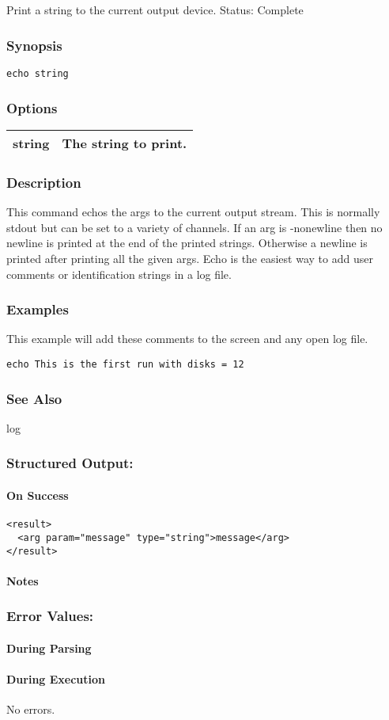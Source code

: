 \subsection{}
\label{echo}
Print a string to the current output device. 
 Status: Complete
\subsubsection*{Synopsis}
\begin{verbatim}
echo string
\end{verbatim}
\subsubsection*{Options}
\begin{tabular}{|l|l|}
\hline 
 string  & The string to print.  \\
 \hline 
\end{tabular}
\subsubsection*{Description}
 This command echos the args to the current output stream. This is normally stdout but can be set to a variety of channels. If an arg is -nonewline then no newline is printed at the end of the printed strings. Otherwise a newline is printed after printing all the given args. Echo is the easiest way to add user comments or identification strings in a log file. 
\subsubsection*{Examples}
 This example will add these comments to the screen and any open log file. \begin{verbatim}
echo This is the first run with disks = 12
\end{verbatim}
\subsubsection*{See Also}
 log
\subsubsection*{Structured Output:}
\paragraph*{On Success}
\begin{verbatim}
<result>
  <arg param="message" type="string">message</arg>
</result>
\end{verbatim}
\paragraph*{Notes}
\subsubsection*{Error Values:}
\paragraph*{During Parsing}
\paragraph*{During Execution}
 No errors. 
